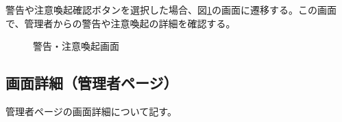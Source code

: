 \documentclass[a4j]{jarticle}
\begin{document}
警告や注意喚起確認ボタンを選択した場合、図\ref{fig:read_warning}の画面に遷移する。この画面で、管理者からの警告や注意喚起の詳細を確認する。

\begin{figure}[H]
\centering
{}
\caption{警告・注意喚起画面}
\label{fig:read_warning}
\end{figure}

\subsection{画面詳細（管理者ページ）}
管理者ページの画面詳細について記す。
\end{document}

